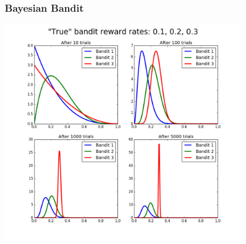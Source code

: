 \documentclass{beamer}
\begin{document}
\begin{frame}
  \frametitle{Bayesian Bandit}
  \begin{center}
    \includegraphics[width=0.8\textwidth]{images/bayesian_bandits.png}
  \end{center}
\end{frame}
\end{document}
